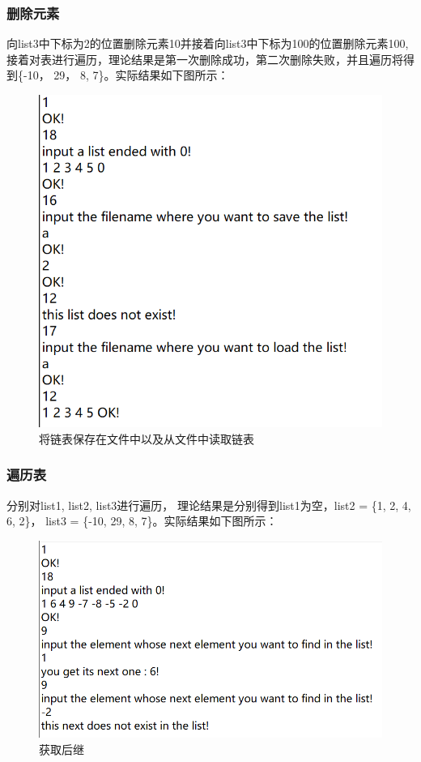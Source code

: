 \documentclass[supercite]{Experimental_Report}
\theoremstyle{definition}
\begin{document}
\subsubsection{删除元素}
向list3中下标为2的位置删除元素10并接着向list3中下标为100的位置删除元素100,接着对表进行遍历，理论结果是第一次删除成功，第二次删除失败，并且遍历将得到\{-10， 29， 8, 7\}。实际结果如下图所示：
\begin{figure}[htbp]
	\centering
	\includegraphics[scale = 0.8]{images/15.png}
	\caption{将链表保存在文件中以及从文件中读取链表}
\end{figure}

\subsubsection{遍历表}
分别对list1, list2, list3进行遍历， 理论结果是分别得到list1为空，list2 = \{1, 2, 4, 6, 2\}， list3 = \{-10, 29, 8, 7\}。实际结果如下图所示：
\begin{figure}[htbp]
	\centering
	\includegraphics[scale = 0.7]{images/8.png}
	\caption{获取后继}
\end{figure}
\end{document}
